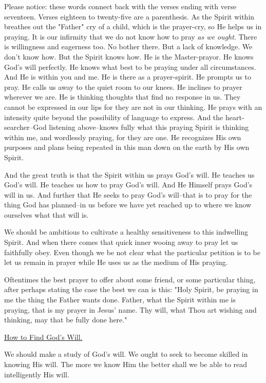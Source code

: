 Please notice: these words connect back with the verses ending with verse
seventeen. Verses eighteen to twenty-five are a parenthesis. As the Spirit
within breathes out the "Father" cry of a child, which is the prayer-cry,
so He helps us in praying. It is our infirmity that we do not know how to
pray \textit{as we ought}. There is willingness and eagerness too. No bother
there. But a lack of knowledge. We don't know how. But the Spirit knows
how. He is the Master-prayor. He knows God's will perfectly. He knows what
best to be praying under all circumstances. And He is within you and me.
He is there as a prayer-spirit. He prompts us to pray. He calls us away to
the quiet room to our knees. He inclines to prayer wherever we are. He is
thinking thoughts that find no response in us. They cannot be expressed in
our lips for they are not in our thinking. He prays with an intensity
quite beyond the possibility of language to express. And the
heart-searcher--God listening above--knows fully what this praying Spirit
is thinking within me, and wordlessly praying, for they are one. He
recognizes His own purposes and plans being repeated in this man down on
the earth by His own Spirit.

And the great truth is that the Spirit within us prays God's will. He
teaches us God's will. He teaches us how to pray God's will. And He
Himself prays God's will in us. And further that He seeks to pray God's
will--that is to pray for the thing God has planned--in us before we have
yet reached up to where we know ourselves what that will is.

We should be ambitious to cultivate a healthy sensitiveness to this
indwelling Spirit. And when there comes that quick inner wooing away to
pray let us faithfully obey. Even though we be not clear what the
particular petition is to be let us remain in prayer while He uses us as
the medium of His praying.

Oftentimes the best prayer to offer about some friend, or some particular
thing, after perhaps stating the case the best we can is this: "Holy
Spirit, be praying in me the thing the Father wants done. Father, what the
Spirit within me is praying, that is my prayer in Jesus' name. Thy will,
what Thou art wishing and thinking, may that be fully done here."



\underline{How to Find God's Will.}


We should make a study of God's will. We ought to seek to become skilled
in knowing His will. The more we know Him the better shall we be able to
read intelligently His will.


